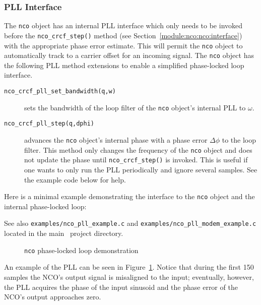 \subsubsection{PLL Interface}
\label{module:nco:pll:interface}
The {\tt nco} object has an internal PLL interface which only needs to
be invoked before the {\tt nco\_crcf\_step()} method
(see Section~\ref{module:nco:nco:interface}) with the appropriate phase
error estimate.
This will permit the {\tt nco} object to automatically track to a
carrier offset for an incoming signal.
%
The {\tt nco} object has the following PLL method extensions to enable a
simplified phase-locked loop interface.
%
\begin{description}
\item[{\tt nco\_crcf\_pll\_set\_bandwidth(q,w)}]
    sets the bandwidth of the loop filter of the {\tt nco} object's
    internal PLL to $\omega$.
\item[{\tt nco\_crcf\_pll\_step(q,dphi)}]
    advances the {\tt nco} object's internal phase with a phase error
    $\Delta\phi$ to the loop filter.
    This method only changes the frequency of the {\tt nco} object and does
    not update the phase until {\tt nco\_crcf\_step()} is invoked.
    This is useful if one wants to only run the PLL periodically and ignore
    several samples.
    See the example code below for help.
\end{description}
%
Here is a minimal example demonstrating the interface to the {\tt nco}
object and the internal phase-locked loop:
%

%
See also
{\tt examples/nco\_pll\_example.c} and
{\tt examples/nco\_pll\_modem\_example.c}
located in the main \liquid\ project directory.
%
\begin{figure}
\centering
{}
\caption{{\tt nco} phase-locked loop demonstration}
\label{fig:module:nco:pll}
\end{figure}
%
An example of the PLL can be seen in Figure~\ref{fig:module:nco:pll}.
Notice that during the first 150 samples the NCO's output signal is
misaligned to the input;
eventually, however, the PLL acquires the phase of the input sinusoid
and the phase error of the NCO's output approaches zero.

